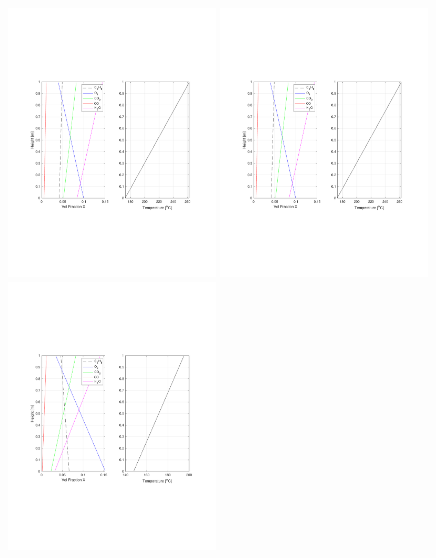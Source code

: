 \documentclass[12pt,letterpaper]{article}
\begin{document}
\begin{flushleft}
\begin{figure}[H]
    \centering
    \includegraphics[trim = 22mm 70mm 27mm 72mm, clip,width=0.49\textwidth]{AOSFST_Paper/Figures/CompositionTemp_FFT_210s}
    \includegraphics[trim = 22mm 70mm 27mm 72mm, clip,width=0.49\textwidth]{AOSFST_Paper/Figures/CompositionTemp_FFT_210s}
     \\
    \includegraphics[trim = 22mm 70mm 27mm 72mm, clip,width=0.49\textwidth]{AOSFST_Paper/Figures/CompositionTemp_FFT_270s}

\end{figure}
\end{flushleft}
\end{document}

